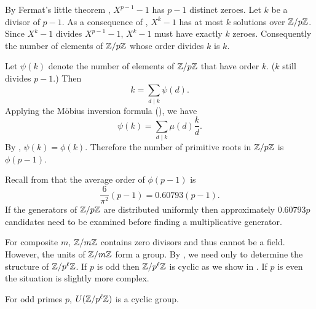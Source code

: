 By Fermat's little theorem , $X^{p-1} - 1$
has $p-1$ distinct zeroes.  Let $k$ be a divisor of $p-1$.  As a
consequence of , $X^k-1$ has at most $k$
solutions over $\mathbb{Z}/p\mathbb{Z}$.  Since $X^k-1$ divides $X^{p-1}-1$, $X^k-1$
must have exactly $k$ zeroes.  Consequently the number of elements of
$\mathbb{Z}/p\mathbb{Z}$ whose order divides $k$ is $k$.

Let $\psi(k)$ denote the number of elements of $\mathbb{Z}/p\mathbb{Z}$ that have
order $k$. ($k$ still divides $p-1$.)  Then
\[
k = \sum_{d \mid k} \psi(d).
\]
Applying the M\"obius inversion formula (), we have
\[
\psi(k) = \sum_{d \mid k} \mu(d) \frac{k}{d}.
\]
By , $\psi(k) = \phi(k)$.  Therefore the
number of primitive roots in $\mathbb{Z}/p\mathbb{Z}$ is $\phi(p-1)$.

Recall from  that the average order of
$\phi(p-1)$ is
\[
\frac{6}{\pi^2} (p-1) = 0.60793 (p -1).
\]
If the generators of $\mathbb{Z}/p\mathbb{Z}$ are distributed uniformly then
approximately $0.60793 p$ candidates need to be examined before
finding a multiplicative generator.

\medskip
For composite $m$, $\mathbb{Z}/m\mathbb{Z}$ contains zero divisors and thus cannot be
a field.  However, the units of $\mathbb{Z}/m\mathbb{Z}$ form a group.  By
, we need only to determine the structure
of $\mathbb{Z}/p^{\ell}\mathbb{Z}$.  If $p$ is odd then $\mathbb{Z}/p^{\ell}\mathbb{Z}$ is cyclic as
we show in .  If $p$ is even the
situation is slightly more complex.

\begin{proposition} \label{FF:Odd:p:Struct:Prop}
For odd primes $p$, $U(\mathbb{Z}/p^{\ell}\mathbb{Z})$ is a cyclic
group. 
\end{proposition}


